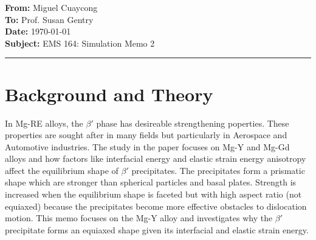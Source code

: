 \documentclass[11pt]{article}
\newcommand{\memoheader}[4]{
  \noindent
  \textbf{From:} #2\\ 
  \textbf{To:} #1\\
  \textbf{Date:} #3\\
  \textbf{Subject:} #4\\[1ex]\hrule\vspace{1.5ex}


}
\newcommand{\bprime} {$\beta'$ }
\begin{document}
\memoheader{Prof. Susan Gentry}
            {Miguel Cuaycong}
            {\today}
            {EMS 164: Simulation Memo 2}


\section*{Background and Theory}
In Mg-RE alloys, the \bprime phase has desireable strengthening poperties. 
These properties are sought after in many fields but particularly in Aerospace and Automotive industries. 
The study in the paper focuses on Mg-Y and Mg-Gd alloys and how factors like interfacial energy and elastic strain energy anisotropy
affect the equilibrium shape of \bprime precipitates. The precipitates form a prismatic shape which are stronger than spherical particles and basal plates. 
Strength is increased when the equilibrium shape is faceted but with high aspect ratio (not equiaxed) because the precipitates become more effective obstacles to dislocation motion. 
This memo focuses on the Mg-Y alloy and investigates why the \bprime precipitate forms an equiaxed shape given its interfacial and elastic strain energy.
\end{document}
